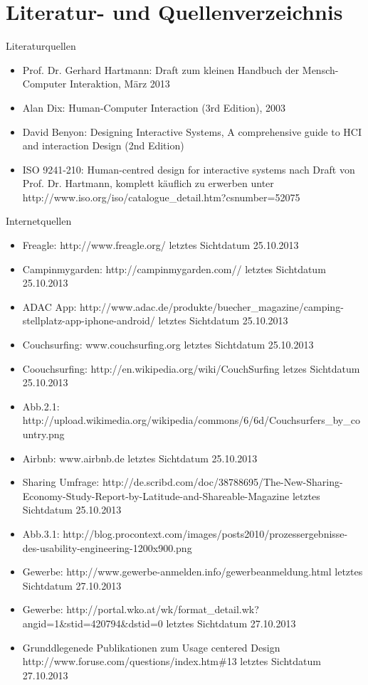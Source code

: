 

\chapter{Literatur- und Quellenverzeichnis}

Literaturquellen 
\begin{itemize}
\item
Prof. Dr. Gerhard Hartmann: Draft zum kleinen Handbuch der Mensch-Computer Interaktion, März 2013
\item
Alan Dix: Human-Computer Interaction (3rd Edition), 2003
\item 
David Benyon: Designing Interactive Systems, A comprehensive guide to HCI and interaction Design (2nd Edition) 
\item
ISO 9241-210: Human-centred design for interactive systems nach Draft von Prof. Dr. Hartmann, komplett käuflich zu erwerben unter \\http://www.iso.org/iso/catalogue\_detail.htm?csnumber=52075

\end{itemize}

Internetquellen 
\begin{itemize}
\item
Freagle: http://www.freagle.org/ letztes Sichtdatum 25.10.2013
\item
Campinmygarden: http://campinmygarden.com// letztes Sichtdatum 25.10.2013
\item
ADAC App: http://www.adac.de/produkte/buecher\_magazine/camping-stellplatz-app-iphone-android/ letztes Sichtdatum 25.10.2013
\item
Couchsurfing: www.couchsurfing.org letztes Sichtdatum 25.10.2013
\item
Coouchsurfing: http://en.wikipedia.org/wiki/CouchSurfing letzes Sichtdatum 25.10.2013
\item
Abb.2.1: http://upload.wikimedia.org/wikipedia/commons/6/6d/Couchsurfers\_by\_country.png
\item
Airbnb: www.airbnb.de letztes Sichtdatum 25.10.2013
\item
Sharing Umfrage: http://de.scribd.com/doc/38788695/The-New-Sharing-Economy-Study-Report-by-Latitude-and-Shareable-Magazine letztes Sichtdatum 25.10.2013
\item
Abb.3.1: http://blog.procontext.com/images/posts2010/prozessergebnisse-des-usability-engineering-1200x900.png
\item
Gewerbe: http://www.gewerbe-anmelden.info/gewerbeanmeldung.html letztes Sichtdatum 27.10.2013
\item
Gewerbe: http://portal.wko.at/wk/format\_detail.wk?angid=1\&stid=420794\&dstid=0 letztes Sichtdatum 27.10.2013
\item
Grunddlegenede Publikationen zum Usage centered Design \\http://www.foruse.com/questions/index.htm\#13 letztes Sichtdatum 27.10.2013


\end{itemize}

\newpage
